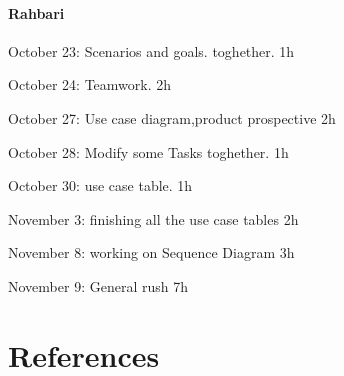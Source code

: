 \documentclass{article}
\begin{document}
	\paragraph{Rahbari}
		\begin{list}{-}{}
			\item October 23: Scenarios and goals. toghether. 1h
			\item October 24: Teamwork. 2h
			\item October 27: Use case diagram,product prospective 2h
			\item October 28: Modify some Tasks toghether. 1h
			\item October 30: use case table. 1h
			\item November 3: finishing all the use case tables 2h
			\item November 8: working on Sequence Diagram 3h
			\item November 9: General rush 7h
		\end{list}
\section{References}
\end{document}
